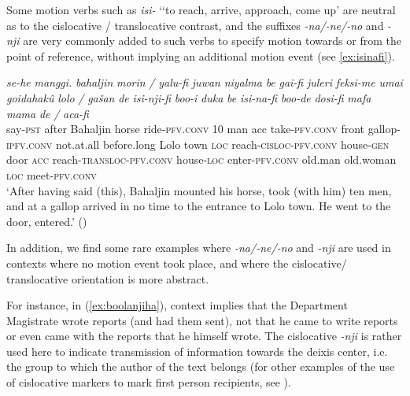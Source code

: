 \documentclass{article}
\newcommand{\ipa}[1]{\textit{{\phon\mbox{#1}}}} %
\begin{document}
Some motion verbs such as \ipa{isi-} `‘to reach, arrive, approach, come up' are neutral as to the cislocative / translocative contrast, and the suffixes \ipa{-na/-ne/-no} and \ipa{-nji} are very commonly added to such verbs to specify motion towards or from the point of reference, without implying an additional motion event (see \ref{ex:isinafi}).

\begin{exe}
\ex \label{ex:isinafi}
\gll
\ipa{se-he} 	\ipa{manggi.} 	\ipa{bahaljin} 	\ipa{morin} 	\ipa{/} 	\ipa{yalu-fi} 	\ipa{juwan} 	\ipa{niyalma} 	\ipa{be} 	\ipa{gai-fi} 	\ipa{juleri} 	\ipa{feksi-me} 	\ipa{umai} 	\ipa{goidahakû} 	\ipa{lolo} 	\ipa{/} 	\ipa{gašan} 	\ipa{de} 	\ipa{isi-nji-fi} 	\ipa{boo-i} 	\ipa{duka} 	\ipa{be} 	\ipa{isi-na-fi} 	\ipa{boo-de} 	\ipa{dosi-fi} 	\ipa{mafa} 	\ipa{mama} 	\ipa{de} 	\ipa{/} 	\ipa{aca-fi} \\
say-\textsc{pst} after Bahaljin horse { } ride-\textsc{pfv.conv} 10 man acc take-\textsc{pfv.conv} front gallop-\textsc{ipfv.conv} not.at.all before.long Lolo { } town \textsc{loc} reach-\textsc{cisloc-pfv.conv} house-\textsc{gen} door \textsc{acc} reach-\textsc{transloc-pfv.conv} house-\textsc{loc} enter-\textsc{pfv.conv} old.man old.woman \textsc{loc} { } meet-\textsc{pfv.conv} \\
\glt `After having said (this), Bahaljin mounted his horse, took (with him) ten men, and at a gallop arrived in no time to the entrance to Lolo town. He went to the door, entered.' (\citealt[68;3a/96]{jaxontov93nisan})
\end{exe}

In addition, we find some rare examples where  \ipa{-na/-ne/-no} and \ipa{-nji} are used in contexts where no motion event took place, and where the cislocative/ translocative orientation is more abstract. 

For instance, in (\ref{ex:boolanjiha}), context implies that the Department Magistrate wrote reports (and had them sent), not that he came to write reports or even came with the reports that he himself wrote. The cislocative \ipa{-nji} is rather used here to indicate transmission of information towards the deixis center, i.e. the group to which the author of the text belongs (for other examples of the use of cislocative markers to mark first person recipients,  see \citealt{jacques14inverse}).
\end{document}
